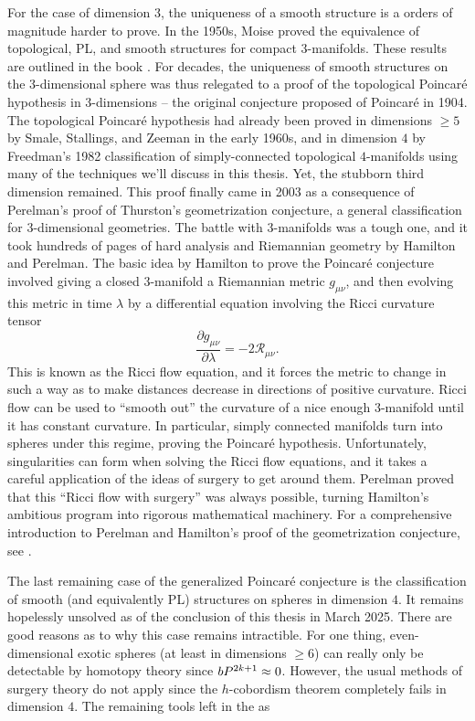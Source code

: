 For the case of dimension $3$, the uniqueness of a smooth structure is a orders of magnitude harder to prove. In the 1950s, Moise proved the equivalence of topological, PL, and smooth structures for compact $3$-manifolds. These results are outlined in the book \cite{moise1977geometric}. For decades, the uniqueness of smooth structures on the 3-dimensional sphere was thus relegated to a proof of the topological Poincar\'e hypothesis in 3-dimensions -- the original conjecture proposed of Poincar\'e in 1904. The topological Poincar\'e hypothesis had already been proved in dimensions $\geq 5$ by Smale, Stallings, and Zeeman in the early 1960s, and in dimension $4$ by Freedman's 1982 classification \cite{freedman1982manifold} of simply-connected topological $4$-manifolds using many of the techniques we'll discuss in this thesis. Yet, the stubborn third dimension remained.
This proof finally came in 2003 as a consequence of Perelman's proof of Thurston's geometrization conjecture, a general classification for 3-dimensional geometries.
The battle with $3$-manifolds was a tough one, and it took hundreds of pages of hard analysis and Riemannian geometry by Hamilton and Perelman.
The basic idea by Hamilton to prove the Poincar\'e conjecture involved giving a
closed $3$-manifold a Riemannian metric $g_{\mu\nu}$, and then evolving this metric in time $\lambda$ by a differential equation involving the Ricci curvature tensor
\begin{equation}
	\frac{\partial g_{\mu\nu}}{\partial \lambda} = -2\mathcal{R}_{\mu\nu}.
\end{equation}
This is known as the Ricci flow equation, and it forces the metric to change in such a way as to make distances decrease in directions of positive curvature.
Ricci flow can be used to ``smooth out'' the curvature of a nice enough $3$-manifold until it has constant curvature. In particular, simply connected manifolds turn into spheres under this regime, proving the Poincar\'e hypothesis.
Unfortunately, singularities can form when solving the Ricci flow equations, and it takes a careful application of the ideas of surgery to get around them. Perelman proved that this ``Ricci flow with surgery'' was always possible, turning Hamilton's ambitious program into rigorous mathematical machinery. For a comprehensive introduction to Perelman and Hamilton's proof of the geometrization conjecture, see \cite{morgantian2007ricci}.

The last remaining case of the generalized Poincar\'e conjecture is the classification of smooth (and equivalently PL) structures on spheres in dimension $4$. It remains hopelessly unsolved as of the conclusion of this thesis in March 2025. There are good reasons as to why this case remains intractible. For one thing, even-dimensional exotic spheres (at least in dimensions $\geq 6$) can really only be detectable by homotopy theory since $bP^{2k+1}\approx 0$. However, the usual methods of surgery theory do not apply since the $h$-cobordism theorem completely fails in dimension $4$. The remaining tools left in the as

